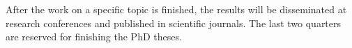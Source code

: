 \documentclass[11pt,dvipsnames,usenames,a4paper]{article}
\begin{document}
After the work on a specific topic is finished, the results will be disseminated at research conferences and published in scientific journals. The last two quarters are reserved for finishing the PhD theses. 

\end{document}
